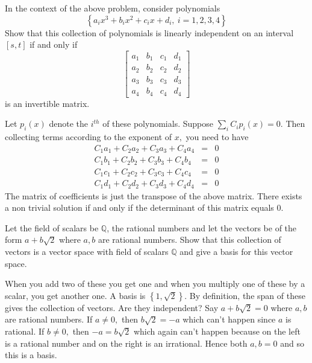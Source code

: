 \documentclass{ximera}
\begin{document}
\begin{problem}\label{prb:10.59} In the context of the above problem, consider polynomials
\begin{equation*}
\left\{ a_{i}x^{3}+b_{i}x^{2}+c_{i}x+d_{i},\ i=1,2,3,4\right\}
\end{equation*}
Show that this collection of polynomials is linearly independent on an
interval $\left[ s,t\right] $ if and only if
\begin{equation*}
\left[
\begin{array}{cccc}
a_{1} & b_{1} & c_{1} & d_{1} \\
a_{2} & b_{2} & c_{2} & d_{2} \\
a_{3} & b_{3} & c_{3} & d_{3} \\
a_{4} & b_{4} & c_{4} & d_{4}
\end{array}
\right]
\end{equation*}
is an invertible matrix.
\begin{hint}
Let $p_{i}\left( x\right) $ denote the $i^{th}$ of
these polynomials. Suppose $\sum_{i}C_{i}p_{i}\left( x\right) =0.$ Then
collecting terms according to the exponent of $x,$ you need to have
\begin{eqnarray*}
C_{1}a_{1}+C_{2}a_{2}+C_{3}a_{3}+C_{4}a_{4} &=&0 \\
C_{1}b_{1}+C_{2}b_{2}+C_{3}b_{3}+C_{4}b_{4} &=&0 \\
C_{1}c_{1}+C_{2}c_{2}+C_{3}c_{3}+C_{4}c_{4} &=&0 \\
C_{1}d_{1}+C_{2}d_{2}+C_{3}d_{3}+C_{4}d_{4} &=&0
\end{eqnarray*}
The matrix of coefficients is just the transpose of the above matrix. There
exists a non trivial solution if and only if the determinant of this matrix
equals 0.
\end{hint}
\end{problem}

\begin{problem}\label{prb:10.60} Let the field of scalars be $\mathbb{Q}$, the rational numbers and let
the vectors be of the form $a+b\sqrt{2}$ where $a,b$ are rational numbers.
Show that this collection of vectors is a vector space with field of scalars
$\mathbb{Q}$ and give a basis for this vector space.
\begin{hint}
When you add two of these you get one and when you multiply one of these by
a scalar, you get another one. A basis is $\left\{ 1,\sqrt{2}\right\} $. By
definition, the span of these gives the collection of vectors. Are they
independent? Say $a+b\sqrt{2}=0$ where $a,b$ are rational numbers. If $a\neq
0,$ then $b\sqrt{2}=-a$ which can't happen since $a$ is rational. If $b\neq
0,$ then $-a=b\sqrt{2}$ which again can't happen because on the left is a
rational number and on the right is an irrational. Hence both $a,b=0$ and so
this is a basis.
\end{hint}
\end{problem}
\end{document}
